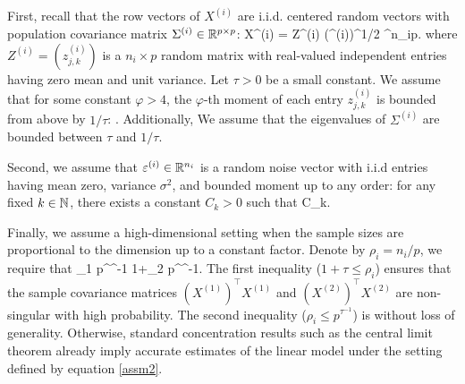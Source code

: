 First, recall that the row vectors of $X^{(i)}$ are i.i.d. centered random vectors with  population covariance matrix $\Sigma^{(i)} \in \mathbb{R}^{p \times p}$:
\be\label{XofZ}
    X^{(i)} = Z^{(i)} (\Sigma^{(i)})^{1/2} \in \real^{n_i\times p}.
\ee
where $Z^{(i)}=(z^{(i)}_{j,k})$ is a $n_i\times p$ random matrix with real-valued independent entries having zero mean and unit variance.
Let $\tau>0$ be a small constant.
We assume that for some constant $\varphi>4$, the $\varphi$-th moment of each entry $z^{(i)}_{j, k}$ is bounded from above by $1/\tau$:
\be \label{conditionA2}
  \le {}. %
\ee
Additionally, We assume that the eigenvalues of $\Sigma^{(i)}$ are bounded between $\tau$ and $1 / \tau$.
 
Second, we assume that $\varepsilon^{(i)} \in \mathbb{R}^{n_i}$ is a random noise vector with i.i.d entries having mean zero, variance $\sigma^2$, and bounded moment up to any order: for any fixed $k\in \mathbb{N}$, there exists a constant $C_k>0$ such that
\be\label{eq_highmoments}
 \le C_k.
\ee


Finally, we assume a high-dimensional setting when the sample sizes are proportional to the dimension up to a constant factor.
Denote by $\rho_i = n_i / p$, we require that
\be\label{assm2}
    \tau \le \rho_1 \le p^{\tau^{-1}}  1+\tau \le \rho_2 \le p^{\tau^{-1}}.
\ee
The first inequality ($1 + \tau \le \rho_i$) ensures that the sample covariance matrices $(X^{(1)})^\top X^{(1)}$ and $(X^{(2)})^\top X^{(2)}$ are non-singular with high probability.
The second inequality ($\rho_i \le p^{\tau^{-1}}$) is without loss of generality.
Otherwise, standard concentration results such as the central limit theorem already imply accurate estimates of the linear model under the setting defined by equation \eqref{assm2}.

